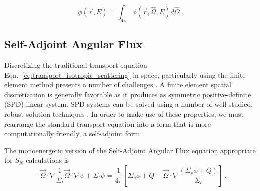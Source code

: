 \begin{equation}
  \phi(\vec{r}, E) = \int_{4\pi} \phi(\vec{r}, \hat{\Omega}, E) d \hat{\Omega}\:.
\end{equation}

\subsection{Self-Adjoint Angular Flux}
Discretizing the traditional transport equation Eqn.~\eqref{eq:transport_isotropic_scattering} in space, particularly using the finite element method presents a number of challenges \cite{saaf}. A finite element spatial discretization is generally favorable as it produces as symmetric positive-definite (SPD) linear system. SPD systems can be solved using a number of well-studied, robust solution techniques \cite{Shewchuck1994}. In order to make use of these properties, we must rearrange the standard transport equation into a form that is more computationally friendly, a self-adjoint form \cite{saaf}.


The monoenergetic version of the Self-Adjoint Angular Flux equation appropriate for $S_N$ calculations is 
\begin{equation}
    - \vec{\Omega} \cdot \nabla \frac{1}{\Sigma_t}\vec{\Omega} \cdot \nabla \psi + \Sigma_t \psi = \frac{1}{4\pi}[\Sigma_s\phi + Q - \vec{\Omega} \cdot \nabla \frac{(\Sigma_s\phi + Q)}{\Sigma_t}]\:.
    \label{eq:SAAF}
\end{equation}



